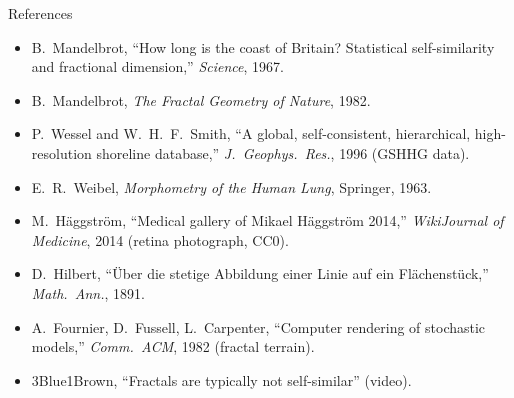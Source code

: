 \begin{frame}{References}
  \footnotesize
  \begin{itemize}
    \item B.~Mandelbrot, ``How long is the coast of Britain? Statistical self-similarity and fractional dimension,'' \textit{Science}, 1967.
    \item B.~Mandelbrot, \textit{The Fractal Geometry of Nature}, 1982.
    \item P.~Wessel and W.~H.~F.~Smith, ``A global, self-consistent, hierarchical, high-resolution shoreline database,'' \textit{J.~Geophys.~Res.}, 1996 (GSHHG data).
    \item E.~R.~Weibel, \textit{Morphometry of the Human Lung}, Springer, 1963.
    \item M.~Häggström, ``Medical gallery of Mikael Häggström 2014,'' \textit{WikiJournal of Medicine}, 2014 (retina photograph, CC0).
    \item D.~Hilbert, ``\"Uber die stetige Abbildung einer Linie auf ein Fl\"achenst\"uck,'' \textit{Math.~Ann.}, 1891.
    \item A.~Fournier, D.~Fussell, L.~Carpenter, ``Computer rendering of stochastic models,'' \textit{Comm.~ACM}, 1982 (fractal terrain).
    \item 3Blue1Brown, ``Fractals are typically not self-similar'' (video).
  \end{itemize}
\end{frame}


